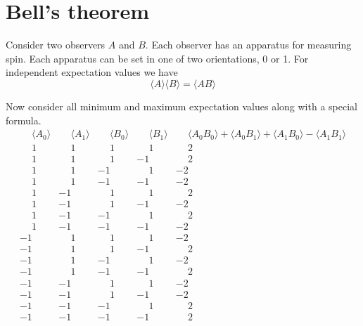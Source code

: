 

\section*{Bell's theorem}

Consider two observers $A$ and $B$.
Each observer has an apparatus for measuring spin.
Each apparatus can be set in one of two orientations, 0 or 1.
For independent expectation values we have
\begin{equation*}
\langle A\rangle\langle B\rangle=\langle AB\rangle
\end{equation*}

Now consider all minimum and maximum expectation values along with a special formula.
\begin{equation*}
\begin{matrix}
\phantom{-}\langle A_0\rangle & \phantom{-}\langle A_1\rangle
& \phantom{-}\langle B_0\rangle & \phantom{-}\langle B_1\rangle
& \phantom{-}\langle A_0B_0\rangle+\langle A_0B_1\rangle+\langle A_1B_0\rangle-\langle A_1B_1\rangle
\\
\phantom{-}1 & \phantom{-}1 & \phantom{-}1 & \phantom{-}1 & \phantom{-}2
\\
\phantom{-}1 & \phantom{-}1 & \phantom{-}1 &           -1 & \phantom{-}2
\\
\phantom{-}1 & \phantom{-}1 &           -1 & \phantom{-}1 &           -2
\\
\phantom{-}1 & \phantom{-}1 &           -1 &           -1 &           -2
\\
\phantom{-}1 &          -1 & \phantom{-}1 & \phantom{-}1 & \phantom{-}2
\\
\phantom{-}1 &          -1 & \phantom{-}1 &           -1 &           -2
\\
\phantom{-}1 &          -1 &           -1 & \phantom{-}1 & \phantom{-}2
\\
\phantom{-}1 &          -1 &           -1 &           -1 &           -2
\\
          -1 & \phantom{-}1 & \phantom{-}1 & \phantom{-}1 &           -2
\\
          -1 & \phantom{-}1 & \phantom{-}1 &           -1 & \phantom{-}2
\\
          -1 & \phantom{-}1 &           -1 & \phantom{-}1 &           -2
\\
          -1 & \phantom{-}1 &           -1 &           -1 & \phantom{-}2
\\
          -1 &           -1 & \phantom{-}1 & \phantom{-}1 &           -2
\\
          -1 &           -1 & \phantom{-}1 &           -1 &           -2
\\
          -1 &           -1 &           -1 & \phantom{-}1 & \phantom{-}2
\\
          -1 &           -1 &           -1 &           -1 & \phantom{-}2
\end{matrix}
\end{equation*}

